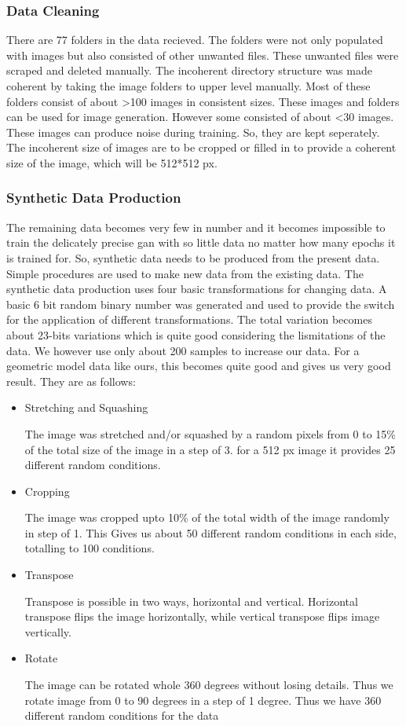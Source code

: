 \documentclass{article}
\begin{document}
    \subsubsection{Data Cleaning}
    There are 77 folders in the data recieved. The folders were not only populated with images but also consisted of other unwanted files. These unwanted files were scraped and deleted manually. The incoherent directory structure was made coherent by taking the image folders to upper level manually. Most of these folders consist of about >100 images in consistent sizes. These images and folders can be used for image generation. However some consisted of about <30 images. These images can produce noise during training. So, they are kept seperately. The incoherent size of images are to be cropped or filled in to provide a coherent size of the image, which will be 512*512 px.
    
    \subsubsection{Synthetic Data Production}
    The remaining data becomes very few in number and it becomes impossible to train the delicately precise gan with so little data no matter how many epochs it is trained for. So, synthetic data needs to be produced from the present data. Simple procedures are used to make new data from the existing data. The synthetic data production uses four basic transformations for changing data. A basic 6 bit random binary number was generated and used to provide the switch for the application of different transformations. The total variation becomes about 23-bits variations which is quite good considering the lismitations of the data. We however use only about 200 samples to increase our data. For a geometric model data like ours, this becomes quite good and gives us very good result.
    They are as follows:
    \begin{itemize}
	\item Stretching and Squashing
	
	The image was stretched and/or squashed by a random pixels from 0 to 15\% of the total size of the image in a step of 3. for a 512 px image it provides 25 different random conditions.
	\item Cropping
	
	The image was cropped upto 10\% of the total width of the image randomly in step of 1. This Gives us about 50 different random conditions in each side, totalling to 100 conditions.
	\item Transpose
	
	Transpose is possible in two ways, horizontal and vertical. Horizontal transpose flips the image horizontally, while vertical transpose flips image vertically.
	\item Rotate
	
	The image can be rotated whole 360 degrees without losing details. Thus we rotate image from 0 to 90 degrees in a step of 1 degree. Thus we have 360 different random conditions for the data
    \end{itemize}
    
\end{document}
